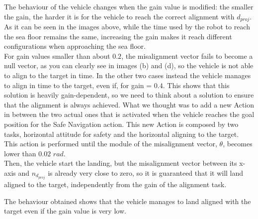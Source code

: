 \documentclass{article}
\begin{document}
\begin{figure}[H]
	\centering
	\hspace{10mm}
	\label{im:v_land_gain0_4}
\end{figure} 

\begin{figure}[H]
	\centering
	\hspace{10mm}
	\label{im:v_land_gain0_7}
\end{figure} 

The behaviour of the vehicle changes when the gain value is modified: the smaller the gain, the harder it is for the vehicle to reach the correct alignment with \(d_{proj}\). As it can be seen in the images above, while the time used by the robot to reach the sea floor remains the same, increasing the gain makes it reach different configurations when approaching the sea floor.\\
For gain values smaller than about \(0.2\), the misalignment vector fails to become a null vector, as you can clearly see in images (b) and (d), so the vehicle is not able to align to the target in time. In the other two cases instead the vehicle manages to align in time to the target, even if, for gain = \(0.4\).
This shows that this solution is heavily gain-dependent, so we need to think about a solution to ensure that the alignment is always achieved.
What we thought was to add a new Action in between the two actual ones that is activated when the vehicle reaches the goal position for the Safe Navigation action. This new Action is composed by two tasks, horizontal attitude for safety and the horizontal aligning to the target. This action is performed until the module of the misalignment vector, $\theta$, becomes lower than \(0.02 \) \({rad}\).\\
Then, the vehicle start the landing, but the misalignment vector between its x-axis and \(n_{d_{proj}}\) is already very close to zero, so it is guaranteed that it will land aligned to the target, independently from the gain of the alignment task.
\begin{figure}[H]
	\centering
	\label{im:v_land_gain0_1_ind}
\end{figure} 
The behaviour obtained shows that the vehicle manages to land aligned with the target even if the gain value is very low.
 
\end{document}
